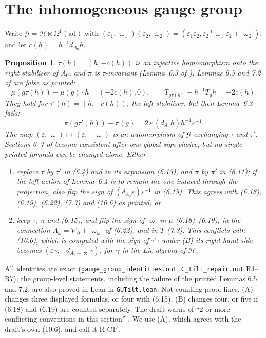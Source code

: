 \documentclass[11pt]{article}
\newtheorem{proposition}[theorem]{Proposition}
\theoremstyle{remark}
\begin{document}
\section{The inhomogeneous gauge group}
Write $\mathcal G=\mathcal H\ltimes\Omega^1(\mathrm{ad})$ with $(\varepsilon_1,\varpi_1)(\varepsilon_2,\varpi_2)=(\varepsilon_1\varepsilon_2,\varepsilon_2^{-1}\varpi_1\varepsilon_2+\varpi_2)$, and let $c(h)=h^{-1}d_{A_0}h$.
\begin{proposition}
$\tau(h)=(h,-c(h))$ is an injective homomorphism onto the right stabiliser of $A_0$, and $\pi$ is $\tau$-invariant (Lemma~6.3 of \cite{W21}). Lemmas 6.5 and 7.2 of \cite{W21} are false as printed:
\[ \mu(g\tau(h))-\mu(g)\cdot h=(-2c(h),0),\qquad T_{g\tau(h)}-h^{-1}T_gh=-2c(h). \]
They hold for $\tau'(h)=(h,+c(h))$, the left stabiliser, but then Lemma~6.3 fails:
\[ \pi(g\tau'(h))-\pi(g)=2\,\varepsilon\,(d_{A_0}h)h^{-1}\varepsilon^{-1}. \]
The map $(\varepsilon,\varpi)\mapsto(\varepsilon,-\varpi)$ is an automorphism of $\mathcal G$ exchanging $\tau$ and $\tau'$. Sections 6--7 of \cite{W21} become consistent after one global sign choice, but no single printed formula can be changed alone. Either
\begin{enumerate}
\item[(A)] replace $\tau$ by $\tau'$ in (6.4) and in its expansion (6.13), and $\pi$ by $\pi'$ in (6.11); if the left action of Lemma~6.4 is to remain the one induced through the projection, also flip the sign of $(d_{A_0}\varepsilon)\varepsilon^{-1}$ in (6.15). This agrees with (6.18), (6.19), (6.22), (7.3) and (10.6) as printed; or
\item[(B)] keep $\tau$, $\pi$ and (6.15), and flip the sign of $\varpi$ in $\mu$ (6.18)--(6.19), in the connection $A_\omega=\nabla_0+\varpi_\omega$ of (6.22), and in $T$ (7.3). This conflicts with (10.6), which is computed with the sign of $\tau'$: under (B) its right-hand side becomes $(\varepsilon\gamma,-d_{A_0-\varpi}\gamma)$, for $\gamma$ in the Lie algebra of $\mathcal H$.
\end{enumerate}
\end{proposition}
All identities are exact (\texttt{gauge\_group\_identities.out}, \texttt{C\_tilt\_repair.out} R1--R7); the group-level statements, including the failure of the printed Lemmas 6.5 and 7.2, are also proved in Lean in \texttt{GUTilt.lean}. Not counting proof lines, (A) changes three displayed formulas, or four with (6.15). (B) changes four, or five if (6.18) and (6.19) are counted separately. The draft warns of ``2 or more conflicting conventions in this section'' \cite[fn.~7, p.~36]{W21}. We use (A), which agrees with the draft's own (10.6), and call it R-C1$'$.
\end{document}
